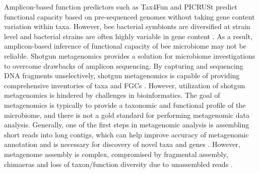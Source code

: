 \documentclass[11pt]{article}
\begin{document}
  Amplicon-based function predictors such as Tax4Fun \citep{asshauer2015tax4fun} and PICRUSt \citep{douglas2018predicting} predict functional capacity based on pre-sequenced genomes without taking gene content variation within taxa. 
  However, bee bacterial symbionts are diversified at strain level \citep{engel2012functional,powell2016strain,ellegaard2020vast} and bacterial strains are often highly variable in gene content \citep{cordero2014explaining,brockhurst2019ecology}. 
  As a result, amplicon-based inference of functional capacity of bee microbiome may not be reliable.
  \newline
  Shotgun metagenomics provides a solution for microbiome investigations to overcome drawbacks of amplicon sequencing. 
  By capturing and sequencing DNA fragments unselectively, shotgun metagenomics is capable of providing comprehensive inventories of taxa and FGCs \citep{quince2017shotgun,new2020metagenomics,galloway2020tools}. 
  However, utilization of shotgun metagenomics is hindered by challenges in bioinformatics. 
  The goal of metagenomics is typically to provide a taxonomic and functional profile of the microbiome, and there is not a gold standard for performing metagenomic data analysis. 
  Generally, one of the first steps in metagenomic analysis is assembling short reads into long contigs, which can help improve accuracy of metagenomic annotation \citep{wommack2008metagenomics,carr2014comparative,tran2020assembling} and is necessary for 
  discovery of novel taxa and genes \citep{culligan2014metagenomics,youngblut2020large}. 
  However, metagenome assembly is complex, compromised by fragmental assembly, chimaeras \citep{mikheenko2016metaquast} and loss of taxon/function diversity due to unassembled reads \citep{vollmers2017comparing,ayling2020new}. 
\end{document}

